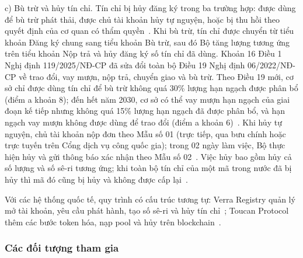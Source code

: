 c) Bù trừ và hủy tín chỉ. Tín chỉ bị hủy đăng ký trong ba trường hợp: được dùng để bù trừ phát thải, được chủ tài khoản hủy tự nguyện, hoặc bị thu hồi theo quyết định của cơ quan có thẩm quyền~\cite{vietnam2026thongtu11}. Khi bù trừ, tín chỉ được chuyển từ tiểu khoản Đăng ký chung sang tiểu khoản Bù trừ, sau đó Bộ tăng lượng tương ứng trên tiểu khoản Nộp trả và hủy đăng ký số tín chỉ đã dùng. Khoản 16 Điều 1 Nghị định 119/2025/NĐ-CP đã sửa đổi toàn bộ Điều 19 Nghị định 06/2022/NĐ-CP về trao đổi, vay mượn, nộp trả, chuyển giao và bù trừ. Theo Điều 19 mới, cơ sở chỉ được dùng tín chỉ để bù trừ không quá 30\% lượng hạn ngạch được phân bổ (điểm a khoản 8); đến hết năm 2030, cơ sở có thể vay mượn hạn ngạch của giai đoạn kế tiếp nhưng không quá 15\% lượng hạn ngạch đã được phân bổ, và hạn ngạch vay mượn không được dùng để trao đổi (điểm a khoản 6)~\cite{vietnam2025nghidinh119}. Khi hủy tự nguyện, chủ tài khoản nộp đơn theo Mẫu số 01 (trực tiếp, qua bưu chính hoặc trực tuyến trên Cổng dịch vụ công quốc gia); trong 02 ngày làm việc, Bộ thực hiện hủy và gửi thông báo xác nhận theo Mẫu số 02~\cite{vietnam2026thongtu11}. Việc hủy bao gồm hủy cả số lượng và số sê-ri tương ứng; khi toàn bộ tín chỉ của một mã trong nước đã bị hủy thì mã đó cũng bị hủy và không được cấp lại~\cite{vietnam2026thongtu11}.

Với các hệ thống quốc tế, quy trình có cấu trúc tương tự: Verra Registry quản lý mở tài khoản, yêu cầu phát hành, tạo số sê-ri và hủy tín chỉ~\cite{verra2024vcs}; Toucan Protocol thêm các bước token hóa, nạp pool và hủy trên blockchain~\cite{toucan2025docs}.

\subsubsection*{Các đối tượng tham gia}

